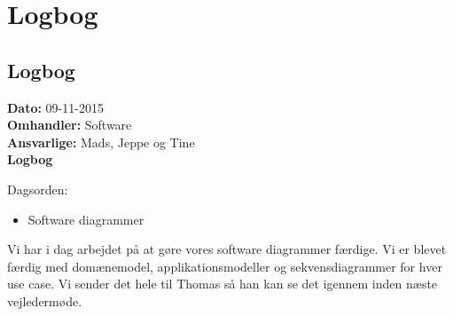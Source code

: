 \chapter{Logbog}
\section{Logbog}

\textbf{Dato:} 09-11-2015 \\
\textbf{Omhandler:} Software \\
\textbf{Ansvarlige:} Mads, Jeppe og Tine \\
\textbf{Logbog}

Dagsorden:
\begin{itemize}
	\item Software diagrammer 
\end{itemize}

Vi har i dag arbejdet på at gøre vores software diagrammer færdige. Vi er blevet færdig med domænemodel, applikationsmodeller og sekvensdiagrammer for hver use case. Vi sender det hele til Thomas så han kan se det igennem inden næste vejledermøde.  
   
